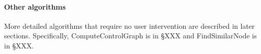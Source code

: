 \paragraph{Other algorithms}
More detailed algorithms that require no user intervention are described in later sections.
Specifically, ComputeControlGraph is in \S XXX and FindSimilarNode is in \S XXX.

%	

%



